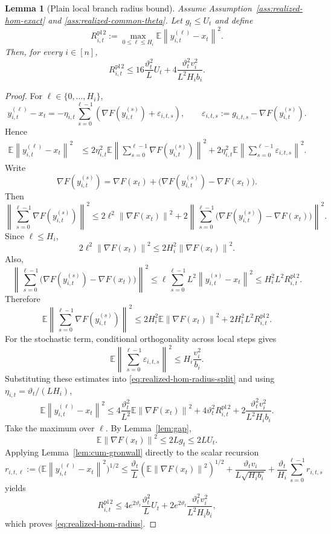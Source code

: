 \documentclass{article}
\newtheorem{lemma}[theorem]{Lemma}
\theoremstyle{definition}
\newcommand{\EE}{\mathbb E}
\newcommand{\norm}[1]{\left\lVert #1\right\rVert}
\begin{document}
\begin{lemma}[Plain local branch radius bound]
\label{lem:realized-hom-radius}
Assume Assumption~\ref{ass:realized-hom-exact} and \ref{ass:realized-common-theta}. Let
$g_t\le U_t$ and define
\[
R_{i,t}^{\mathrm{pl}\,2}:=
\max_{0\le \ell\le H_i}\EE\norm{y_{i,t}^{(\ell)}-x_t}^2.
\]
Then, for every $i\in[n]$,
\begin{equation}
R_{i,t}^{\mathrm{pl}\,2}
\le
16\frac{\vartheta_t^2}{L}U_t
+
4\frac{\vartheta_t^2 v_i^2}{L^2H_i b_i}.
\label{eq:realized-hom-radius}\end{equation}
\end{lemma}

\begin{proof}
For $\ell\in\{0,\dots,H_i\}$,
\[
y_{i,t}^{(\ell)}-x_t
=
-\eta_{i,t}\sum_{s=0}^{\ell-1}
\left(
\nabla F(y_{i,t}^{(s)})+\varepsilon_{i,t,s}
\right),
\qquad
\varepsilon_{i,t,s}:=g_{i,t,s}-\nabla F(y_{i,t}^{(s)}).
\]
Hence
\begin{align}
\EE\norm{y_{i,t}^{(\ell)}-x_t}^2
&\le
2\eta_{i,t}^2
\EE\left\|
\sum_{s=0}^{\ell-1}\nabla F(y_{i,t}^{(s)})
\right\|^2
+
2\eta_{i,t}^2
\EE\left\|
\sum_{s=0}^{\ell-1}\varepsilon_{i,t,s}
\right\|^2.
\label{eq:realized-hom-radius-split}
\end{align}
Write
\[
\nabla F(y_{i,t}^{(s)})=\nabla F(x_t)+\bigl(\nabla F(y_{i,t}^{(s)})-\nabla F(x_t)\bigr).
\]
Then
\[
\left\|
\sum_{s=0}^{\ell-1}\nabla F(y_{i,t}^{(s)})
\right\|^2
\le
2\ell^2\norm{\nabla F(x_t)}^2
+
2
\left\|
\sum_{s=0}^{\ell-1}
\bigl(\nabla F(y_{i,t}^{(s)})-\nabla F(x_t)\bigr)
\right\|^2.
\]
Since $\ell\le H_i$,
\[
2\ell^2\norm{\nabla F(x_t)}^2
\le
2H_i^2\norm{\nabla F(x_t)}^2.
\]
Also,
\[
\left\|
\sum_{s=0}^{\ell-1}
\bigl(\nabla F(y_{i,t}^{(s)})-\nabla F(x_t)\bigr)
\right\|^2
\le
\ell\sum_{s=0}^{\ell-1}
L^2\norm{y_{i,t}^{(s)}-x_t}^2
\le
H_i^2L^2 R_{i,t}^{\mathrm{pl}\,2}.
\]
Therefore
\[
\EE\left\|
\sum_{s=0}^{\ell-1}\nabla F(y_{i,t}^{(s)})
\right\|^2
\le
2H_i^2\EE\norm{\nabla F(x_t)}^2
+
2H_i^2L^2 R_{i,t}^{\mathrm{pl}\,2}.
\]
For the stochastic term, conditional orthogonality across local steps gives
\[
\EE\left\|
\sum_{s=0}^{\ell-1}\varepsilon_{i,t,s}
\right\|^2
\le
H_i\frac{v_i^2}{b_i}.
\]
Substituting these estimates into \eqref{eq:realized-hom-radius-split} and using
$\eta_{i,t}=\vartheta_t/(L H_i)$,
\[
\EE\norm{y_{i,t}^{(\ell)}-x_t}^2
\le
4\frac{\vartheta_t^2}{L^2}\EE\norm{\nabla F(x_t)}^2
+
4\vartheta_t^2 R_{i,t}^{\mathrm{pl}\,2}
+
2\frac{\vartheta_t^2 v_i^2}{L^2H_i b_i}.
\]
Take the maximum over $\ell$. By Lemma~\ref{lem:gap},
\[
\EE\norm{\nabla F(x_t)}^2\le 2L g_t\le 2L U_t.
\]
Applying Lemma~\ref{lem:cum-gronwall} directly to the scalar recursion
\[
r_{i,t,\ell}:=\bigl(\EE\norm{y_{i,t}^{(\ell)}-x_t}^2\bigr)^{1/2}
\le
\frac{\vartheta_t}{L}(\EE\norm{\nabla F(x_t)}^2)^{1/2}
+
\frac{\vartheta_t v_i}{L\sqrt{H_i b_i}}
+
\frac{\vartheta_t}{H_i}\sum_{s=0}^{\ell-1} r_{i,t,s}
\]
yields
\[
R_{i,t}^{\mathrm{pl}\,2}
\le
4 e^{2\vartheta_t}\frac{\vartheta_t^2}{L}U_t
+
2 e^{2\vartheta_t}\frac{\vartheta_t^2 v_i^2}{L^2H_i b_i},
\]
which proves \eqref{eq:realized-hom-radius}.
\end{proof}
\end{document}
